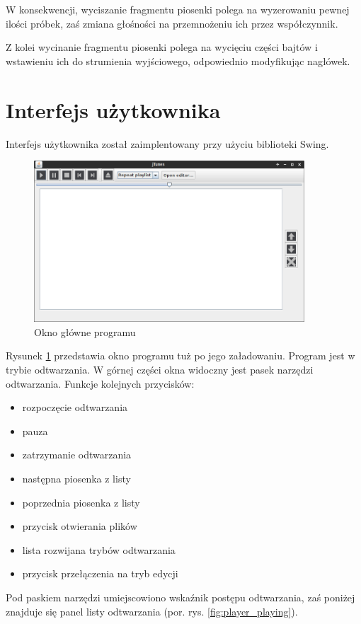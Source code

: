 \documentclass[12pt,a4paper,notitlepage]{article}
\begin{document}
W konsekwencji, wyciszanie fragmentu piosenki polega na wyzerowaniu pewnej ilości próbek, zaś zmiana głośności na przemnożeniu ich przez współczynnik. 

Z kolei wycinanie fragmentu piosenki polega na wycięciu części bajtów i wstawieniu ich do strumienia wyjściowego, odpowiednio modyfikując nagłówek.

\section{Interfejs użytkownika}
\label{sec:Interfejs}
Interfejs użytkownika został zaimplentowany przy użyciu biblioteki Swing.

\begin{figure}[H]
 \centering
 \includegraphics[width=0.9\textwidth]{img/player_blank.png}
 \caption{Okno główne programu}
 \label{fig:player_blank}
\end{figure}

Rysunek \ref{fig:player_blank} przedstawia okno programu tuż po jego załadowaniu. Program jest w trybie odtwarzania. W górnej części okna widoczny jest pasek narzędzi odtwarzania. Funkcje kolejnych
przycisków:
\begin{itemize}
 \item rozpoczęcie odtwarzania
 \item pauza
 \item zatrzymanie odtwarzania
 \item następna piosenka z listy
 \item poprzednia piosenka z listy
 \item przycisk otwierania plików
 \item lista rozwijana trybów odtwarzania
 \item przycisk przełączenia na tryb edycji
\end{itemize}
Pod paskiem narzędzi umiejscowiono wskaźnik postępu odtwarzania, zaś poniżej znajduje się panel listy odtwarzania (por. rys. \ref{fig:player_playing}).
\end{document}
